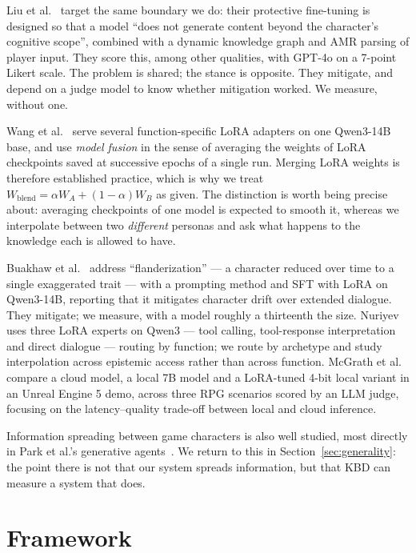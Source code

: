 \documentclass[conference]{IEEEtran}
\begin{document}
Liu et al.~\cite{liu2025personalized} target the same boundary we do: their
protective fine-tuning is designed so that a model ``does not generate content
beyond the character's cognitive scope'', combined with a dynamic knowledge
graph and AMR parsing of player input. They score this, among other qualities,
with GPT-4o on a 7-point Likert scale. The problem is shared; the stance is
opposite. They mitigate, and depend on a judge model to know whether mitigation
worked. We measure, without one.

Wang et al.~\cite{wang2025fusion} serve several function-specific LoRA
adapters on one Qwen3-14B base, and use \emph{model fusion} in the sense of
averaging the weights of LoRA checkpoints saved at successive epochs of a
single run. Merging LoRA weights is therefore established practice, which is
why we treat $W_{\text{blend}} = \alpha W_A + (1-\alpha) W_B$ as given. The
distinction is worth being precise about: averaging checkpoints of one model
is expected to smooth it, whereas we interpolate between two \emph{different}
personas and ask what happens to the knowledge each is allowed to have.

Buakhaw et al.~\cite{buakhaw2025deflanderization} address ``flanderization''
--- a character reduced over time to a single exaggerated trait --- with a
prompting method and SFT with LoRA on Qwen3-14B, reporting that it mitigates
character drift over extended dialogue. They mitigate; we measure, with a
model roughly a thirteenth the size.
Nuriyev~\cite{nuriyev2025toolcalling} uses three LoRA experts on Qwen3 --- tool
calling, tool-response interpretation and direct dialogue --- routing by
function; we route by archetype and study interpolation across epistemic
access rather than across function.
McGrath et al.~\cite{mcgrath2025echoes} compare a cloud model, a local 7B model
and a LoRA-tuned 4-bit local variant in an Unreal Engine 5 demo, across three
RPG scenarios scored by an LLM judge, focusing on the latency--quality trade-off
between local and cloud inference.

Information spreading between game characters is also well studied, most
directly in Park et al.'s generative agents~\cite{park2023generative}. We
return to this in Section~\ref{sec:generality}: the point there is not that
our system spreads information, but that KBD can measure a system that does.

\section{Framework}
\end{document}
